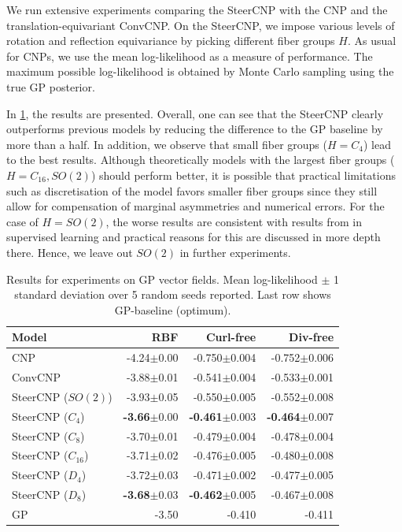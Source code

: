 We run extensive experiments comparing the SteerCNP with the CNP and the translation-equivariant ConvCNP.
On the SteerCNP, we impose various levels of rotation and reflection equivariance by picking different fiber groups $H$.
As usual for CNPs, we use the mean log-likelihood as a measure of performance.
The maximum possible log-likelihood is obtained by Monte Carlo sampling using the true GP posterior.

In \cref{table:GP_results}, the results are presented.
Overall, one can see that the SteerCNP clearly outperforms previous models by reducing the difference to the GP baseline by more than a half.
In addition, we observe that small fiber groups ($H=C_4$) lead to the best results.
Although theoretically models with the largest fiber groups ($H=C_{16},SO(2)$) should perform better, it is possible that practical limitations such as discretisation of the model favors smaller fiber groups since they still allow for compensation of marginal asymmetries and numerical errors.
For the case of $H=SO(2)$, the worse results are consistent with results from \textcite{E2Steerable} in supervised learning and practical reasons for this are discussed in more depth there.
Hence, we leave out $SO(2)$ in further experiments.

\begin{table}[t]
	\small
	\centering
	\caption{Results for experiments on GP vector fields.
		Mean log-likelihood $\pm$ 1 standard deviation over 5 random seeds reported.
		Last row shows GP-baseline (optimum).
	}
	\begin{tabular}[b]{lrrr}
		\toprule
		\textbf{Model}      & RBF                     & Curl-free                 & Div-free                  \\
		\midrule
		CNP                 & -4.24$\pm$0.00          & -0.750$\pm$0.004          & -0.752$\pm$0.006          \\
		ConvCNP             & -3.88$\pm$0.01          & -0.541$\pm$0.004          & -0.533$\pm$0.001          \\
		\midrule
		SteerCNP ($SO(2)$)  & -3.93$\pm$0.05          & -0.550$\pm$0.005          & -0.552$\pm$0.008          \\
		SteerCNP ($C_4$)    & \textbf{-3.66}$\pm$0.00 & \textbf{-0.461}$\pm$0.003 & \textbf{-0.464}$\pm$0.007 \\
		SteerCNP ($C_8$)    & -3.70$\pm$0.01          & -0.479$\pm$0.004          & -0.478$\pm$0.004          \\
		SteerCNP ($C_{16}$) & -3.71$\pm$0.02          & -0.476$\pm$0.005          & -0.480$\pm$0.008          \\
		SteerCNP ($D_4$)    & -3.72$\pm$0.03          & -0.471$\pm$0.002          & -0.477$\pm$0.005          \\
		SteerCNP ($D_8$)    & \textbf{-3.68}$\pm$0.03 & \textbf{-0.462}$\pm$0.005 & -0.467$\pm$0.008          \\
		\midrule
		GP                  & -3.50                   & -0.410                    & -0.411                    \\
		\bottomrule
	\end{tabular}
	\label{table:GP_results}
\end{table}


